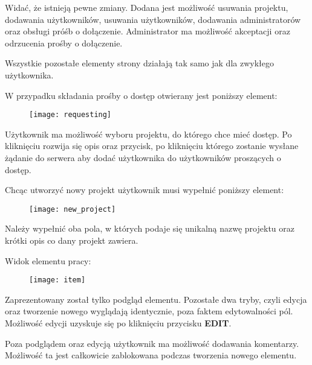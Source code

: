\documentclass[11pt, titlepage]{article}
\begin{document}
Widać, że istnieją pewne zmiany. Dodana jest możliwość usuwania projektu, dodawania użytkowników, usuwania użytkowników, dodawania administratorów oraz obsługi próśb o dołączenie. Administrator ma możliwość akceptacji oraz odrzucenia prośby o dołączenie.

Wszystkie pozostałe elementy strony działają tak samo jak dla zwykłego użytkownika.

\break

W przypadku składania prośby o dostęp otwierany jest poniższy element:

\begin{figure}[H]
\texttt{[image: requesting]}
\end{figure}

Użytkownik ma możliwość wyboru projektu, do którego chce mieć dostęp. Po kliknięciu rozwija się opis oraz przycisk, po kliknięciu którego zostanie wysłane żądanie do serwera aby dodać użytkownika do użytkowników proszących o dostęp.

\break

Chcąc utworzyć nowy projekt użytkownik musi wypełnić poniższy element:

\begin{figure}[H]
\texttt{[image: new\_project]}
\end{figure}

Należy wypełnić oba pola, w których podaje się unikalną nazwę projektu oraz krótki opis co dany projekt zawiera.

\break

Widok elementu pracy:

\begin{figure}[H]
\begin{adjustwidth}{-3cm}{}
\texttt{[image: item]}
\end{adjustwidth}
\end{figure}

Zaprezentowany został tylko podgląd elementu. Pozostałe dwa tryby, czyli edycja oraz tworzenie nowego wyglądają identycznie, poza faktem edytowalności pól. Możliwość edycji uzyskuje się po kliknięciu przycisku \textbf{EDIT}.

Poza podglądem oraz edycją użytkownik ma możliwość dodawania komentarzy. Możliwość ta jest całkowicie zablokowana podczas tworzenia nowego elementu.
\end{document}
